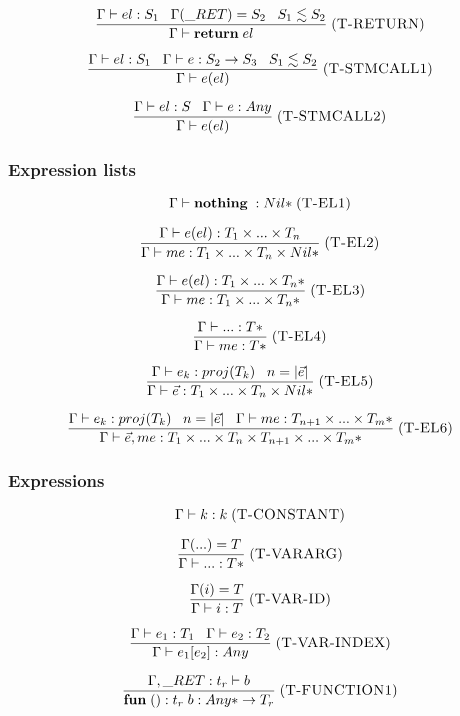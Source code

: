 \documentclass[12pt]{article}
\newcommand{\mylabel}[1]{\; (\textsc{#1})}
\newcommand{\kw}[1]{\mathbf{#1} \;}
\newcommand{\env}{\Gamma}
\newcommand{\ret}{\string_RET}
\begin{document}
\[
\frac{\env \vdash el:S_{1} \;\;\;
      \env(\ret) = S_{2} \;\;\;
      S_{1} \lesssim S_{2}}
     {\env \vdash \kw{return} el}
\mylabel{T-RETURN}
\]

\[
\frac{\env \vdash el:S_{1} \;\;\;
      \env \vdash e:S_{2} \rightarrow S_{3} \;\;\;
      S_{1} \lesssim S_{2}}
     {\env \vdash e(el)}
\mylabel{T-STMCALL1}
\]

\[
\frac{\env \vdash el:S \;\;\;
      \env \vdash e:Any}
     {\env \vdash e(el)}
\mylabel{T-STMCALL2}
\]

\subsubsection{Expression lists}

\[
\env \vdash \kw{nothing}:{Nil*}
\mylabel{T-EL1}
\]

\[
\frac{\env \vdash e(el):T_{1} \times ... \times T_{n}}
     {\env \vdash me:T_{1} \times ... \times T_{n} \times {Nil*}}
\mylabel{T-EL2}
\]

\[
\frac{\env \vdash e(el):T_{1} \times ... \times {T_{n}*}}
     {\env \vdash me:T_{1} \times ... \times {T_{n}*}}
\mylabel{T-EL3}
\]

\[
\frac{\env \vdash {...}:{T*}}
     {\env \vdash me:{T*}}
\mylabel{T-EL4}
\]

\[
\frac{\env \vdash e_{k}:proj(T_{k}) \;\;\;
      n = |\vec{e}|}
     {\env \vdash \vec{e}:T_{1} \times ... \times T_{n} \times {Nil*}}
\mylabel{T-EL5}
\]

\[
\frac{\env \vdash e_{k}:proj(T_{k}) \;\;\;
      n = |\vec{e}|\;\;\;
      \env \vdash me:T_{n+1} \times ... \times {T_{m}*}}
     {\env \vdash \vec{e},me:T_{1} \times ... \times T_{n} \times T_{n+1} \times ... \times {T_{m}*}}
\mylabel{T-EL6}
\]

\subsubsection{Expressions}

\[
\env \vdash k : k
\mylabel{T-CONSTANT}
\]

\[
\frac{\env({...}) = T}
     {\env \vdash {...} : {T*}}
\mylabel{T-VARARG}
\]

\[
\frac{\env(i) = T}
     {\env \vdash i : T}
\mylabel{T-VAR-ID}
\]

\[
\frac{\env \vdash e_{1}:T_{1} \;\;\;
      \env \vdash e_{2}:T_{2}}
     {\env \vdash e_{1}[e_{2}] : Any}
\mylabel{T-VAR-INDEX}
\]

\[
\frac{\env, \ret:t_{r} \vdash b}
     {\kw{fun} ():t_{r} \; b : {Any*} \rightarrow T_{r}}
\mylabel{T-FUNCTION1}
\]
\end{document}
